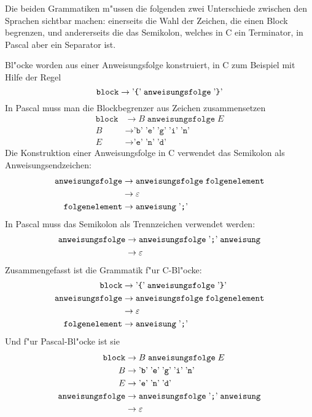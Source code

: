 \begin{loesung}
Die beiden Grammatiken m"ussen die folgenden zwei Unterschiede zwischen
den Sprachen sichtbar machen: einerseits die Wahl der Zeichen,
die einen Block begrenzen, und andererseits die das Semikolon, welches
in C ein Terminator, in Pascal aber ein Separator ist.

Bl"ocke worden aus einer Anweisungsfolge konstruiert, in C zum Beispiel
mit Hilfe der Regel
\[
\texttt{block}
\rightarrow
\text{'{\tt \{}'}\;\texttt{anweisungsfolge}\; \text{'{\tt\}}'}
\]
In Pascal muss man die Blockbegrenzer aus Zeichen zusammensetzen
\begin{align*}
\texttt{block}
&\rightarrow
B\; \texttt{anweisungsfolge}\;E
\\
B&\rightarrow
\text{'}\texttt{b}\text{'}\;
\text{'}\texttt{e}\text{'}\;
\text{'}\texttt{g}\text{'}\;
\text{'}\texttt{i}\text{'}\;
\text{'}\texttt{n}\text{'}
\\
E&\rightarrow
\text{'}\texttt{e}\text{'}\;
\text{'}\texttt{n}\text{'}\;
\text{'}\texttt{d}\text{'}
\end{align*}
Die Konstruktion einer Anweisungsfolge in C verwendet das Semikolon als
Anweisungsendzeichen:
\begin{align*}
\texttt{anweisungsfolge}
&\rightarrow
\texttt{anweisungsfolge}
\;
\texttt{folgenelement}
\\
&\rightarrow\varepsilon
\\
\texttt{folgenelement}
&\rightarrow 
\texttt{anweisung}
\;\text{'{\tt ;}'}
\end{align*}
In Pascal muss das Semikolon als Trennzeichen verwendet werden:
\begin{align*}
\texttt{anweisungsfolge}
&\rightarrow
\texttt{anweisungsfolge} \; \text{'{\tt ;}'}\; \texttt{anweisung}
\\
&\rightarrow\varepsilon
\end{align*}
Zusammengefasst ist die Grammatik f"ur C-Bl"ocke:
\begin{align*}
\texttt{block}
&\rightarrow
\text{'{\tt \{}'}\;\texttt{anweisungsfolge}\; \text{'{\tt\}}'}
\\
\texttt{anweisungsfolge}
&\rightarrow
\texttt{anweisungsfolge}
\;
\texttt{folgenelement}
\\
&\rightarrow\varepsilon
\\
\texttt{folgenelement}
&\rightarrow 
\texttt{anweisung}
\;\text{'{\tt ;}'}
\end{align*}
Und f"ur Pascal-Bl"ocke ist sie
\begin{align*}
\texttt{block}
&\rightarrow
B\; \texttt{anweisungsfolge}\;E
\\
B&\rightarrow
\text{'}\texttt{b}\text{'}\;
\text{'}\texttt{e}\text{'}\;
\text{'}\texttt{g}\text{'}\;
\text{'}\texttt{i}\text{'}\;
\text{'}\texttt{n}\text{'}
\\
E&\rightarrow
\text{'}\texttt{e}\text{'}\;
\text{'}\texttt{n}\text{'}\;
\text{'}\texttt{d}\text{'}
\\
\texttt{anweisungsfolge}
&\rightarrow
\texttt{anweisungsfolge} \; \text{'{\tt ;}'}\; \texttt{anweisung}
\\
&\rightarrow\varepsilon
\end{align*}
\end{loesung}

